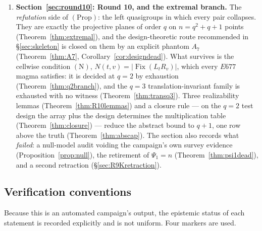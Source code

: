 \documentclass[11pt]{article}
\theoremstyle{plain}
\theoremstyle{definition}
\theoremstyle{remark}
\numberwithin{equation}{section}
\newcommand{\Fix}{\operatorname{Fix}}
\begin{document}
\begin{enumerate}
\item \textbf{Section~\ref{sec:round10}: Round 10, and the extremal branch.} The
\emph{refutation} side of $(\mathrm{Prop})$: the left quasigroups in which every pair
collapses. They are exactly the projective planes of order $q$ on $n = q^2+q+1$ points
(Theorem~\ref{thm:extremal}), and the design-theoretic route recommended in
\S\ref{sec:skeleton} is closed on them by an explicit phantom $A_7$
(Theorem~\ref{thm:A7}, Corollary~\ref{cor:designdead}). What survives is the cellwise
condition $(\mathrm{N})$, $N(t,v) = |\Fix(L_tR_v)|$, which every $E677$ magma satisfies:
it is decided at $q = 2$ by exhaustion (Theorem~\ref{thm:q2branch}), and the $q = 3$
translation-invariant family is exhausted with no witness
(Theorem~\ref{thm:transq3}). Three realizability lemmas
(Theorem~\ref{thm:R10lemmas}) and a closure rule --- on the $q = 2$ test design the
array plus the design determines the multiplication table (Theorem~\ref{thm:closure})
--- reduce the abstract bound to $q+1$, one row above the truth
(Theorem~\ref{thm:abscap}). The section also
records what \emph{failed}: a null-model audit voiding the campaign's own survey evidence
(Proposition~\ref{prop:null}), the retirement of $\Psi_1 = n$
(Theorem~\ref{thm:psi1dead}), and a second retraction
(\S\ref{sec:R9Kretraction}).
\end{enumerate}

\subsection{Verification conventions}\label{sec:conventions}

Because this is an automated campaign's output, the epistemic status of each statement is
recorded explicitly and is not uniform. Four markers are used.
\end{document}
